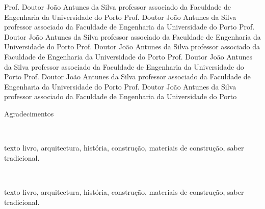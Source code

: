 \documentclass[11pt,twoside,a4paper]{report}
\begin{document}
\TitlePage
  \vspace*{55mm}
       {}
       {Prof. Doutor João Antunes da Silva}
       {professor associado da Faculdade de Engenharia da Universidade do Porto}
       {Prof. Doutor João Antunes da Silva}
       {professor associado da Faculdade de Engenharia da Universidade do Porto}
   \JURI{}
       {Prof. Doutor João Antunes da Silva}
       {professor associado da Faculdade de Engenharia da Universidade do Porto} 
   \JURI{}
       {Prof. Doutor João Antunes da Silva}
       {professor associado da Faculdade de Engenharia da Universidade do Porto} 
   \JURI{}
       {Prof. Doutor João Antunes da Silva}
       {professor associado da Faculdade de Engenharia da Universidade do Porto} 
   \JURI{}
       {Prof. Doutor João Antunes da Silva}
       {professor associado da Faculdade de Engenharia da Universidade do Porto} 
   \JURI{}
       {Prof. Doutor João Antunes da Silva}
       {professor associado da Faculdade de Engenharia da Universidade do Porto}      
   \EndTitlePage
\titlepage\ \endtitlepage %


%
%
%
%
\TitlePage
  \vspace*{55mm}
       {Agradecimentos}
  \SECTION{}
       {
       \blindtext[3]
       }

\EndTitlePage
\titlepage\ \endtitlepage %


%
%
%
\TitlePage
  \vspace*{55mm}
       {texto livro, arquitectura, história, construção, materiais de construção, saber tradicional.}
  \vspace*{10mm}
       {
       \blindtext[3]
			}

\EndTitlePage
\titlepage\ \endtitlepage %


%
%
%
%
\TitlePage
  \vspace*{55mm}
       { texto livro, arquitectura, história, construção, materiais de construção, saber tradicional.}
  \vspace*{10mm}
       {
       \blindtext[3]
       }

\EndTitlePage
\titlepage\ \endtitlepage %
\end{document}
